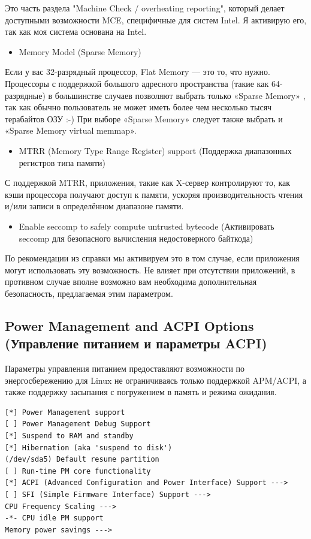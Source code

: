 \documentclass[10pt]{book}
\begin{document}
Это часть раздела "Machine Check / overheating reporting", который делает доступными возможности MCE, специфичные для систем Intel. Я активирую его, так как моя система основана на Intel. 
\begin{itemize}
\item Memory Model (Sparse Memory) 
\end{itemize}

Если у вас 32-разрядный процессор, Flat Memory — это то, что нужно. Процессоры с поддержкой большого адресного пространства (такие как 64-разрядные) в большинстве случаев позволяют выбрать только «Sparse Memory» , так как обычно пользователь не может иметь более чем несколько тысяч терабайтов ОЗУ :-)  При выборе «Sparse Memory» следует также выбрать и «Sparse Memory virtual memmap».

\begin{itemize}
\item MTRR (Memory Type Range Register) support (Поддержка диапазонных регистров типа памяти)
\end{itemize}

С поддержкой MTRR, приложения, такие как X-сервер контролируют то, как кэши процессора получают доступ к памяти, ускоряя производительность чтения и/или записи в определённом диапазоне памяти.

\begin{itemize}
\item Enable seccomp to safely compute untrusted bytecode (Активировать seccomp для безопасного вычисления недостоверного байткода)
\end{itemize}

По рекомендации из справки мы активируем это в том случае, если приложения могут использовать эту возможность. Не влияет при отсутствии приложений, в противном случае вполне возможно вам необходима дополнительная безопасность, предлагаемая этим параметром. 

\subsection {Power Management and ACPI Options (Управление питанием и параметры ACPI)}

Параметры управления питанием предоставляют возможности по энергосбережению для Linux не ограничиваясь только поддержкой APM/ACPI, а также поддержку засыпания с погружением в память и режима ожидания.

\vspace{3mm}
\begin{tcolorbox}[colback=gray!14!white, colframe=blue!75!blue]
\begin{lstlisting}
[*] Power Management support
[ ] Power Management Debug Support
[*] Suspend to RAM and standby
[*] Hibernation (aka 'suspend to disk')
(/dev/sda5) Default resume partition
[ ] Run-time PM core functionality
[*] ACPI (Advanced Configuration and Power Interface) Support --->
[ ] SFI (Simple Firmware Interface) Support --->
CPU Frequency Scaling --->
-*- CPU idle PM support
Memory power savings --->
\end{lstlisting}
\end{tcolorbox}
\end{document}
